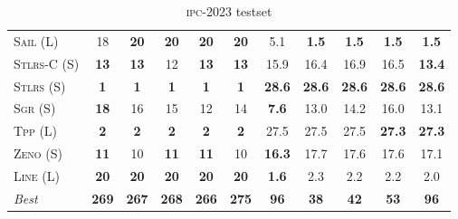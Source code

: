 \documentclass[11pt]{article}
\begin{document}
\begin{table}[tb]
{\begin{tabular}{|l||ccccc||ccccc||}
\textsc{Sail} (L)&18&\textbf{20}&\textbf{20}&\textbf{20}&\textbf{20}&5.1&\textbf{1.5}&\textbf{1.5}&\textbf{1.5}&\textbf{1.5}\\
\textsc{Stlrs-C} (S)&\textbf{13}&\textbf{13}&12&\textbf{13}&\textbf{13}&15.9&16.4&16.9&16.5&\textbf{13.4}\\
\textsc{Stlrs} (S)&\textbf{1}&\textbf{1}&\textbf{1}&\textbf{1}&\textbf{1}&\textbf{28.6}&\textbf{28.6}&\textbf{28.6}&\textbf{28.6}&\textbf{28.6}\\
\textsc{Sgr} (S)&\textbf{18}&16&15&12&14&\textbf{7.6}&13.0&14.2&16.0&13.1\\
\textsc{Tpp} (L)&\textbf{2}&\textbf{2}&\textbf{2}&\textbf{2}&\textbf{2}&27.5&27.5&27.5&\textbf{27.3}&\textbf{27.3}\\
\textsc{Zeno} (S)&\textbf{11}&10&\textbf{11}&\textbf{11}&10&\textbf{16.3}&17.7&17.6&17.6&17.1\\
\textsc{Line} (L)&\textbf{20}&\textbf{20}&\textbf{20}&\textbf{20}&\textbf{20}&\textbf{1.6}&2.3&2.2&2.2&2.0
\\\hline
\textit{Best}&\textbf{269}&\textbf{267}&\textbf{268}&\textbf{266}&\textbf{275}&\textbf{96}&\textbf{38}&\textbf{42}&\textbf{53}&\textbf{96}\\\hline

        \end{tabular}}
        \caption{\textsc{ipc}-2023 testset}
        \label{tab:ipc}
        \end{table}
        
\end{document}
